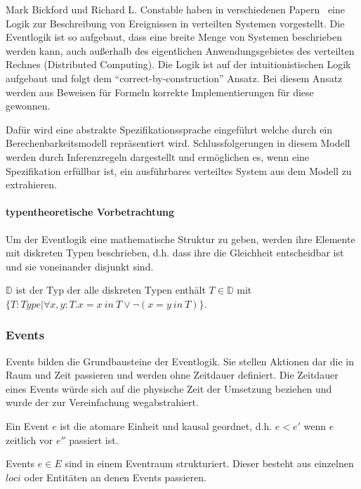 Mark Bickford und Richard L. Constable haben in verschiedenen
Papern~\cite{bickford2003logic, bickford2005causal, bickford2009component} eine Logik zur Beschreibung
von Ereignissen in verteilten Systemen vorgestellt. Die Eventlogik ist so
aufgebaut, dass eine breite Menge von Systemen beschrieben werden kann, auch
außerhalb des eigentlichen Anwendungsgebietes des verteilten Rechnes
(Distributed Computing).  Die Logik ist auf der
intuitionistischen Logik aufgebaut und folgt dem ``correct-by-construction''
Ansatz. Bei diesem Ansatz werden aus Beweisen für Formeln korrekte Implementierungen für
diese gewonnen.~\cite{bates1985proofs}

Dafür wird eine abstrakte Spezifikationssprache eingeführt welche durch
ein Berechenbarkeitsmodell repräsentiert wird.
Schlussfolgerungen in diesem Modell werden durch Inferenzregeln dargestellt und
ermöglichen es, wenn eine Spezifikation erfüllbar ist, ein ausführbares
verteiltes System aus dem Modell zu extrahieren.~\cite{bickford2005causal}


\paragraph{typentheoretische Vorbetrachtung}
Um der Eventlogik eine mathematische Struktur zu geben, werden ihre
Elemente mit diskreten Typen beschrieben, d.h. dass ihre die Gleichheit
entscheidbar ist und sie voneinander disjunkt sind.

\begin{defi}
  $\mathbb{D}$ ist der Typ der alle diskreten Typen enthält $T\in\mathbb{D}$ mit $\{T:Type|\forall x,y : T.x = x\ in\ T \vee\neg (x = y\ in\
  T)\}$.
\end{defi}

\subsubsection{Events}
Events bilden die Grundbausteine der Eventlogik.
Sie stellen Aktionen dar die in Raum und Zeit passieren und
werden ohne Zeitdauer definiert.
Die Zeitdauer eines Events würde sich auf die physische Zeit der
Umsetzung beziehen und wurde der zur Vereinfachung
wegabstrahiert.~\cite{bickford2005causal}

\begin{defi}
  Ein Event $e$ ist die atomare Einheit und kausal geordnet, d.h.
  $e< e'$ wenn $e$ zeitlich vor $e''$ passiert ist.
\end{defi}

\begin{defi}
  Events $e\in E$ sind in einem Eventraum strukturiert. Dieser besteht
  aus einzelnen $loci$ oder Entitäten an denen Events passieren.
\end{defi}

